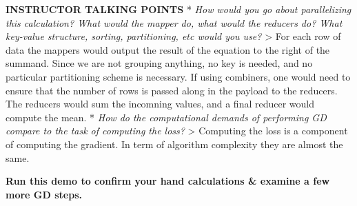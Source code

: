 \documentclass[11pt]{article}
\begin{document}
\textbf{INSTRUCTOR TALKING POINTS} * \emph{How would you go about
parallelizing this calculation? What would the mapper do, what would the
reducers do? What key-value structure, sorting, partitioning, etc would
you use?} \textgreater{} For each row of data the mappers would output
the result of the equation to the right of the summand. Since we are not
grouping anything, no key is needed, and no particular partitioning
scheme is necessary. If using combiners, one would need to ensure that
the number of rows is passed along in the payload to the reducers. The
reducers would sum the incomning values, and a final reducer would
compute the mean. * \emph{How do the computational demands of performing
GD compare to the task of computing the loss?} \textgreater{} Computing
the loss is a component of computing the gradient. In term of algorithm
complexity they are almost the same.

    \textbf{Run this demo to confirm your hand calculations \& examine a few
more GD steps.}
\end{document}
